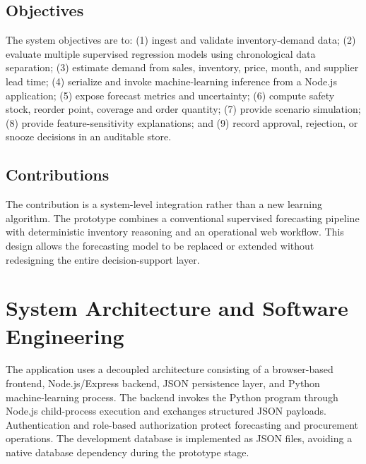 \documentclass[9pt,conference]{IEEEtran}
\providecommand{\syscite}[1]{}
\begin{document}
\subsection{Objectives}
The system objectives are to: (1) ingest and validate inventory-demand data; (2) evaluate multiple supervised regression models using chronological data separation; (3) estimate demand from sales, inventory, price, month, and supplier lead time; (4) serialize and invoke machine-learning inference from a Node.js application; (5) expose forecast metrics and uncertainty; (6) compute safety stock, reorder point, coverage and order quantity; (7) provide scenario simulation; (8) provide feature-sensitivity explanations; and (9) record approval, rejection, or snooze decisions in an auditable store. \syscite{[cite: 1]}

\subsection{Contributions}
The contribution is a system-level integration rather than a new learning algorithm. \syscite{[cite: 1]} The prototype combines a conventional supervised forecasting pipeline with deterministic inventory reasoning and an operational web workflow. \syscite{[cite: 1]} This design allows the forecasting model to be replaced or extended without redesigning the entire decision-support layer. \syscite{[cite: 1]}

\section{System Architecture and Software Engineering}
The application uses a decoupled architecture consisting of a browser-based frontend, Node.js/Express backend, JSON persistence layer, and Python machine-learning process. \syscite{[cite: 1]} The backend invokes the Python program through Node.js child-process execution and exchanges structured JSON payloads. \syscite{[cite: 1]} Authentication and role-based authorization protect forecasting and procurement operations. \syscite{[cite: 1]} The development database is implemented as JSON files, avoiding a native database dependency during the prototype stage. \syscite{[cite: 1]}
\end{document}
